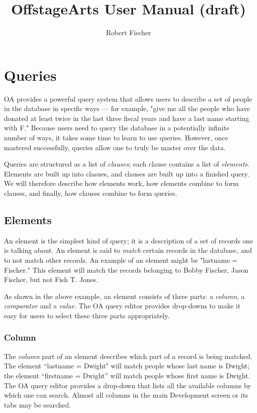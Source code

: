 \documentclass[11pt]{article}
\title{OffstageArts User Manual (draft)}
\author{Robert Fischer}
\begin{document}
\maketitle


\section{Queries}

OA provides a powerful query system that allows users to describe a set of people in the database in specific ways --- for example, "give me all the people who have donated at least twice in the last three fiscal years and have a last name starting with F."  Because users need to query the database in a potentially infinite number of ways, it takes some time to learn to use queries.  However, once mastered successfully, queries allow one to truly be master over the data.

Queries are structured as a list of \emph{clauses}; each clause contains a list of \emph{elements}.  Elements are built up into clasues, and clauses are built up into a finished query.  We will therefore describe how elements work, how elements combine to form clauses, and finally, how clauses combine to form queries.

\subsection{Elements}

An element is the simplest kind of query; it is a description of a set of records one is talking about.  An element is said to \emph{match} certain records in the database, and to not match other records.  An example of an element might be "lastname = Fischer."  This element will match the records belonging to Bobby Fischer, Jason Fischer, but not Fish T. Jones.

As shown in the above example, an element consists of three parts: a \emph{column}, a \emph{comparator} and a \emph{value}.  The OA query editor provides drop-downs to make it easy for users to select these three parts appropriately.

\subsubsection{Column}

The \emph{column} part of an element describes which part of a record is being matched.  The element ``lastname = Dwight" will match people whose last name is Dwight; the element ``firstname = Dwight'' will match people whose first name is Dwight.  The OA query editor provides a drop-down that lists all the available columns by which one can search.  Almost all columns in the main Development screen or its tabs may be searched.
\end{document}
